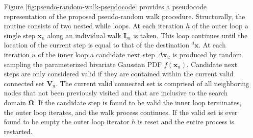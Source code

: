 Figure \ref{fig:pseudo-random-walk-pseudocode} provides a pseudocode representation of the proposed pseudo-random walk procedure. Structurally, the routine consists of two nested while loops. At each iteration $h$ of the outer loop a single step $\textbf{x}_n$ along an individual walk $\textbf{I}_m$ is taken. This loop continues until the location of the current step is equal to that of the destination ${}^{d}\textbf{x}$. At each iteration $u$ of the inner loop a candidate next step $\Delta \textbf{x}_u$ is produced by random sampling the parameterized bivariate Gaussian PDF $f(\textbf{x}_u)$. Candidate next steps are only considered valid if they are contained within the current valid connected set $\textbf{V}_n$. The current valid connected set is comprised of all neighboring nodes that not been previously visited and that are inclusive to the search domain $\boldsymbol{\Omega}$.  If the candidate step is found to be valid the inner loop terminates, the outer loop iterates, and the walk process continues. If the valid set is ever found to be empty the outer loop iterator $h$ is reset and the entire process is restarted. \\
            
